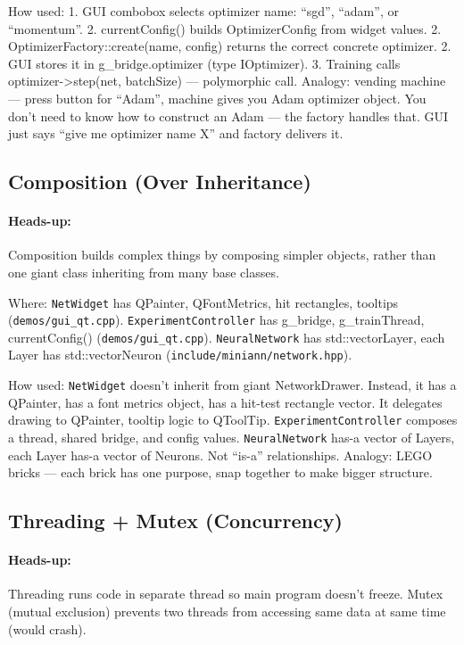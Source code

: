 \documentclass[12pt]{article}
\begin{document}
How used: 1. GUI combobox selects optimizer name: ``sgd'', ``adam'', or ``momentum''. 2. currentConfig() builds OptimizerConfig from widget values. 2. OptimizerFactory::create(name, config) returns the correct concrete optimizer. 2. GUI stores it in g\_bridge.optimizer (type IOptimizer). 3. Training calls optimizer->step(net, batchSize) — polymorphic call. Analogy: vending machine — press button for ``Adam'', machine gives you Adam optimizer object. You don't need to know how to construct an Adam — the factory handles that. GUI just says ``give me optimizer name X'' and factory delivers it.

\subsection{Composition (Over Inheritance)}
\paragraph{Heads-up:} Composition builds complex things by composing simpler objects, rather than one giant class inheriting from many base classes.

Where: \texttt{NetWidget} has QPainter, QFontMetrics, hit rectangles, tooltips (\texttt{demos/gui\_qt.cpp}). \texttt{ExperimentController} has g\_bridge, g\_trainThread, currentConfig() (\texttt{demos/gui\_qt.cpp}). \texttt{NeuralNetwork} has std::vector\<Layer\>, each Layer has std::vector\<Neuron\> (\texttt{include/miniann/network.hpp}).

How used: \texttt{NetWidget} doesn't inherit from giant NetworkDrawer. Instead, it has a QPainter, has a font metrics object, has a hit-test rectangle vector. It delegates drawing to QPainter, tooltip logic to QToolTip. \texttt{ExperimentController} composes a thread, shared bridge, and config values. \texttt{NeuralNetwork} has-a vector of Layers, each Layer has-a vector of Neurons. Not ``is-a'' relationships. Analogy: LEGO bricks — each brick has one purpose, snap together to make bigger structure.

\subsection{Threading + Mutex (Concurrency)}
\paragraph{Heads-up:} Threading runs code in separate thread so main program doesn't freeze. Mutex (mutual exclusion) prevents two threads from accessing same data at same time (would crash).
\end{document}

